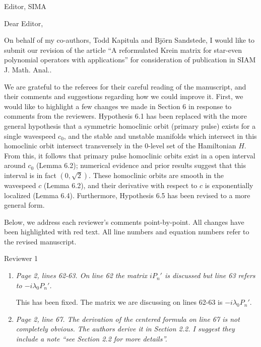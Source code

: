 \documentclass[11pt]{letter}
\begin{document}
\address{Ross Parker \\
Division of Applied Mathematics \\
Brown University \\
Providence, RI 02912 \\
\texttt{ross\_parker@brown.edu}}%
\signature{Ross Parker}
\begin{letter}{Editor, SIMA}

\opening{Dear Editor,}

On behalf of my co-authors, Todd Kapitula and Bj\"orn Sandstede, I would like to submit our revision of the article ``A reformulated Krein matrix for star-even polynomial operators with applications'' for consideration of publication in SIAM J. Math. Anal..

We are grateful to the referees for their careful reading of the manuscript, and their comments and suggestions regarding how we could improve it. First, we would like to highlight a few changes we made in Section 6 in response to comments from the reviewers. Hypothesis 6.1 has been replaced with the more general hypothesis that a symmetric homoclinic orbit (primary pulse) exists for a single wavespeed $c_0$, and the stable and unstable manifolds which intersect in this homoclinic orbit intersect transversely in the 0-level set of the Hamiltonian $H$. From this, it follows that primary pulse homoclinic orbits exist in a open interval around $c_0$ (Lemma 6.2); numerical evidence and prior results suggest that this interval is in fact $(0, \sqrt{2})$. These homoclinic orbits are smooth in the wavespeed $c$ (Lemma 6.2), and their derivative with respect to $c$ is exponentially localized (Lemma 6.4). Furthermore, Hypothesis 6.5 has been revised to a more general form.

Below, we address each reviewer's comments point-by-point. All changes have been highlighted with red text. All line numbers and equation numbers refer to the revised manuscript.

Reviewer 1
\begin{enumerate}

\item \emph{Page 2, lines 62-63. On line 62 the matrix $iP_n'$ is discussed but line 63 refers to $-i\lambda_0 P_n'$.}
\vspace{4mm}

This has been fixed. The matrix we are discussing on lines 62-63 is $-i\lambda_0 P_n'$.

\item \emph{Page 2, line 67. The derivation of the centered formula on line 67 is not completely obvious. The authors derive it in Section 2.2. I suggest they include a note ``see Section 2.2 for more details''.}
\vspace{4mm}


\end{enumerate}
\end{letter}
\end{document}

